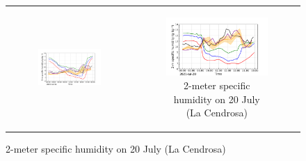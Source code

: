 \begin{figure}[hbtp]
\begin{tabular}{cc}
\begin{subfigure}[t]{0.5\textwidth}
            \includegraphics[width=\textwidth]{images/chap5/IOP_TS/TS_2021-07-15_cendrosa_q2m.png}
        \end{subfigure} &
        \begin{subfigure}[t]{0.5\textwidth}
            \caption{2-meter specific humidity on 20 July (La Cendrosa)}
            \includegraphics[width=\textwidth]{images/chap5/IOP_TS/TS_2021-07-20_cendrosa_q2m.png}
        \end{subfigure} \\


\end{tabular}
\end{figure}
